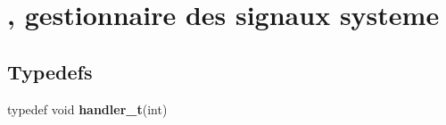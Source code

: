 \hypertarget{group___sighandler}{}\section{, gestionnaire des signaux systeme}
\label{group___sighandler}
\subsection*{Typedefs}
\begin{DoxyCompactItemize}
\item 
\hypertarget{group___sighandler_gacefb2ae1d743b3e28bdcd190cd1060f5}{}typedef void {\bfseries handler\+\_\+t}(int)\label{group___sighandler_gacefb2ae1d743b3e28bdcd190cd1060f5}

\end{DoxyCompactItemize}
